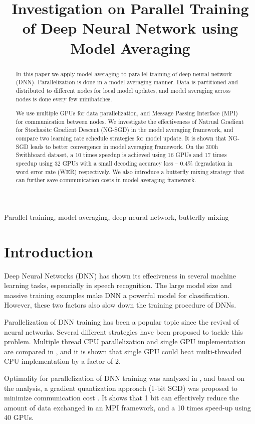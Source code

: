\documentclass{article}
\title{Investigation on Parallel Training of Deep Neural Network using Model Averaging}
\begin{document}
%
\maketitle
%
\begin{abstract}
In this paper we apply model averaging to parallel training of deep neural network (DNN). 
Parallelization is done in a model averaging manner. Data is partitioned and distributed to different nodes for 
local model updates, and model averaging across nodes is done every few minibatches. 

We use multiple GPUs for data parallelization, and Message Passing Interface (MPI) for communication between nodes. 
We investigate the effectiveness of Natrual Gradient for Stochasitc Gradient Descent (NG-SGD) in the model averaging
framework, and compare two learning rate schedule strategies for model update. It is shown that NG-SGD leads to better
convergence in model averaging framework. On the 300h Swithboard dataset, a 10 times speedup is achieved using 16 GPUs
and 17 times speedup using 32 GPUs with a small decoding accuracy loss -- 0.4\% degradation in word error rate 
(WER) respectively. We also introduce a butterfly mixing strategy that can further save communication costs in model 
averaging framework.
\end{abstract}
%
\begin{keywords}
Parallel training, model averaging, deep neural network, butterfly mixing
\end{keywords}
%
\section{Introduction}
\label{sec:intro}
Deep Neural Networks (DNN) has shown its effeciveness in several machine learning tasks, espencially in speech
recognition. The large model size and massive training examples make DNN a powerful model for classification. However,
these two factors also slow down the training procedure of DNNs.

Parallelization of DNN training has been a popular topic since the revival of neural networks. Several different strategies
have been proposed to tackle this problem. Multiple thread CPU parallelization and single GPU implementation are compared
in \cite{scanzio2010parallel,vesely2010parallel}, and it is shown that single GPU could beat multi-threaded CPU implementation
by a factor of 2.

Optimality for parallelization of DNN training was analyzed in \cite{seide2014parallelizability}, and based on the analysis, 
a gradient quantization approach (1-bit SGD) was proposed to minimize communication cost \cite{seide20141}. It shows that 1 bit
can effectively reduce the amount of data exchanged in an MPI framework, and a 10 times speed-up using 40 GPUs.
\end{document}
